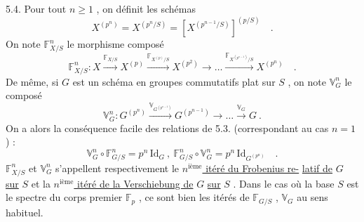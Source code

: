 5.4. \quad Pour tout $n \geq 1$ , on définit les schémas
\[ X^{(p^{n})} = X^{(p^{n}/S)} = [X^{(p^{n-1}/S)}]^{(p/S)} \quad . \]
On note $\mathbb{F}^{n}_{X/S}$ le morphisme composé
\[ \mathbb{F}^{n}_{X/S} : X \xrightarrow{\mathbb{F}_{X/S}} X^{(p)} \xrightarrow{\mathbb{F}_{X^{(p)}/S}} X^{(p^{2})} \to \dots \xrightarrow{\mathbb{F}_{X^{(p^{n-1})}/S}} X^{(p^{n})} \quad . \]
De même, si $G$ est un schéma en groupes commutatifs plat sur $S$ , on
note $\mathbb{V}^{n}_{G}$ le composé
\[ \mathbb{V}^{n}_{G} : G^{(p^{n})} \xrightarrow{\mathbb{V}_{G^{(p^{n-1})}}} G^{(p^{n-1})} \to \dots \xrightarrow{\mathbb{V}_{G}} G \ . \]
On a alors la conséquence facile des relations de 5.3. (correspondant
au cas $n = 1$) :
\[ \mathbb{V}^{n}_{G} \circ \mathbb{F}^{n}_{G/S} = p^{n}\,\mathrm{Id}_{G} \ , \ \mathbb{F}^{n}_{G/S} \circ \mathbb{V}^{n}_{G} = p^{n}\,\mathrm{Id}_{G^{(p^{n})}} \quad . \]
$\mathbb{F}^{n}_{X/S}$ et $\mathbb{V}^{n}_{G}$ s'appellent respectivement le \uline{$n^{\text{ième}}$ itéré du Frobenius re-}%
\uline{latif de} $G$ \uline{sur} $S$ et la \uline{$n^{\text{ième}}$ itéré de la Verschiebung de} $G$ \uline{sur} $S$ .
Dans le cas où la base $S$ est le spectre du corps premier $\mathbb{F}_{p}$ , ce sont
bien les itérés de $\mathbb{F}_{G/S}$ , $\mathbb{V}_{G}$ au sens habituel.

